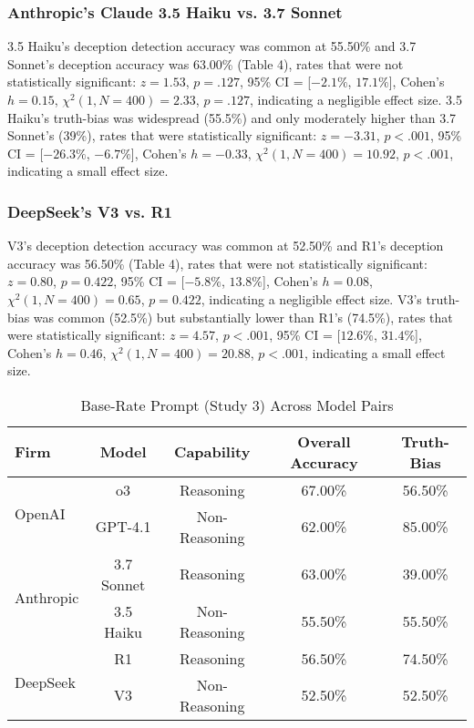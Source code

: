 \documentclass{article}
\begin{document}
\subsubsection{Anthropic's Claude 3.5 Haiku vs. 3.7 Sonnet}

3.5 Haiku's deception detection accuracy was common at 55.50\% and 3.7 Sonnet's deception accuracy was 63.00\% (Table 4), rates that were not statistically significant:  $z = 1.53$, $p = .127$, 95\% CI = [$-2.1\%$, $17.1\%$], Cohen’s $h =0.15$, $\chi^2(1, N = 400) = 2.33$, $p = .127$, indicating a negligible effect size. 3.5 Haiku's truth-bias was widespread (55.5\%) and only moderately higher than 3.7 Sonnet's (39\%), rates that were statistically significant: $z = -3.31$, $p < .001$, 95\% CI = [$-26.3\%$, $-6.7\%$], Cohen’s $h = -0.33$, $\chi^2(1, N = 400) = 10.92$, $p < .001$, indicating a small effect size.

\subsubsection{DeepSeek's V3 vs. R1}

V3's deception detection accuracy was common at 52.50\% and R1's deception accuracy was 56.50\% (Table 4), rates that were not statistically significant:  $z = 0.80$, $p = 0.422$, 95\% CI = [$-5.8\%$, $13.8\%$], Cohen’s $h =0.08$, $\chi^2(1, N = 400) = 0.65$, $p = 0.422$, indicating a negligible effect size. V3's truth-bias was common (52.5\%) but substantially lower than R1's (74.5\%), rates that were statistically significant: $z = 4.57$, $p < .001$, 95\% CI = [$12.6\%$, $31.4\%$], Cohen’s $h = 0.46$, $\chi^2(1, N = 400) = 20.88$, $p < .001$, indicating a small effect size.

\begin{table}[ht]
\centering
\caption{Base-Rate Prompt (Study 3) Across Model Pairs}
\begin{tabular}{lcccc}
\toprule
\textbf{Firm} & \textbf{Model} & \textbf{Capability} & \textbf{Overall Accuracy} & \textbf{Truth-Bias} \\
\midrule
\multirow{2}{*}{OpenAI} & o3 & Reasoning & 67.00\% & 56.50\%   \\
& GPT-4.1 & Non-Reasoning & 62.00\% & 85.00\% \\
\midrule
\multirow{2}{*}{Anthropic} & 3.7 Sonnet & Reasoning & 63.00\% & 39.00\% \\
& 3.5 Haiku & Non-Reasoning & 55.50\% & 55.50\% \\
\midrule
\multirow{2}{*}{DeepSeek} & R1 & Reasoning & 56.50\% & 74.50\% \\
& V3 & Non-Reasoning & 52.50\% & 52.50\% \\
\bottomrule
\end{tabular}
\label{tab:study3_model_comparison}
\end{table}
\end{document}
